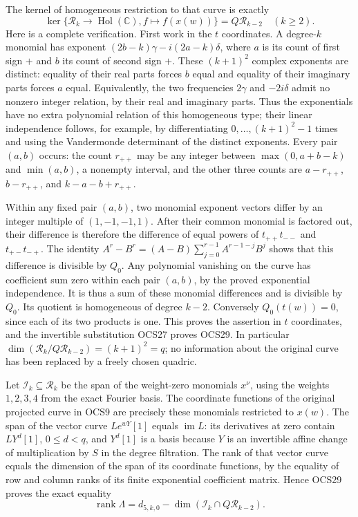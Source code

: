 \documentclass[11pt,a4paper]{article}
\begin{document}
The kernel of homogeneous restriction to that curve is exactly
\[
 \ker\{\mathcal R_k\to\operatorname{Hol}(\mathbb C),
                         f\mapsto f(x(w))\}
            =Q\mathcal R_{k-2}\quad(k\geq2).
 \tag{OCS29}
\]
Here is a complete verification. First work in the $t$ coordinates.
A degree-$k$ monomial has exponent
$(2b-k)\gamma-i(2a-k)\delta$, where $a$ is its count of
first sign $+$ and $b$ its count of second sign $+$.
These $(k+1)^2$ complex exponents are distinct: equality of
their real parts forces $b$ equal and equality of their
imaginary parts forces $a$ equal. Equivalently, the two
frequencies $2\gamma$ and $-2i\delta$ admit no nonzero
integer relation, by their real and imaginary parts. Thus
the exponentials have no extra polynomial relation of this
homogeneous type; their linear independence follows, for
example, by differentiating $0,\ldots,(k+1)^2-1$ times and
using the Vandermonde determinant of the distinct exponents.
Every pair $(a,b)$ occurs: the count $r_{++}$ may be any integer
between $\max(0,a+b-k)$ and $\min(a,b)$, a nonempty interval,
and the other three counts are $a-r_{++}$, $b-r_{++}$,
and $k-a-b+r_{++}$.

Within any fixed pair $(a,b)$, two monomial exponent vectors
differ by an integer multiple of $(1,-1,-1,1)$. After their
common monomial is factored out, their difference is therefore
the difference of equal powers of $t_{++}t_{--}$ and
$t_{+-}t_{-+}$. The identity
$A^r-B^r=(A-B)\sum_{j=0}^{r-1}A^{r-1-j}B^j$ shows that
this difference is divisible by $Q_0$. Any polynomial
vanishing on the curve has coefficient sum zero within
each pair $(a,b)$, by the proved exponential independence.
It is thus a sum of these monomial differences and is
divisible by $Q_0$. Its quotient is homogeneous of degree
$k-2$. Conversely $Q_0(t(w))=0$, since each of its two
products is one. This proves the assertion in $t$
coordinates, and the invertible substitution OCS27 proves
OCS29. In particular
$\dim(\mathcal R_k/Q\mathcal R_{k-2})=(k+1)^2=q$;
no information about the original curve has been replaced
by a freely chosen quadric.

Let $\mathcal I_k\subseteq\mathcal R_k$ be the span of the
weight-zero monomials $x^\nu$, using the weights $1,2,3,4$
from the exact Fourier basis. The coordinate functions of
the original projected curve in OCS9 are precisely these
monomials restricted to $x(w)$. The span of the vector
curve $Le^{wY}[1]$ equals $\operatorname{im}L$: its
derivatives at zero contain $LY^d[1]$, $0\leq d<q$, and
$Y^d[1]$ is a basis because $Y$ is an invertible affine
change of multiplication by $S$ in the degree filtration.
The rank of that vector curve equals the dimension of
the span of its coordinate functions, by the equality of
row and column ranks of its finite exponential coefficient
matrix. Hence OCS29 proves the exact equality
\[
 \operatorname{rank}\Lambda
   =d_{5,k,0}-\dim(\mathcal I_k\cap Q\mathcal R_{k-2}).
 \tag{OCS30}
\]
\end{document}
